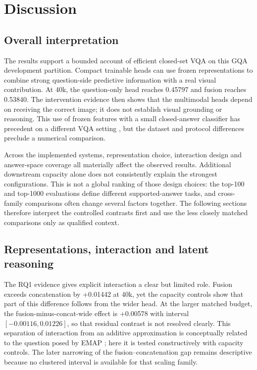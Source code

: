 \chapter{Discussion}

\section{Overall interpretation}
\label{sec:ch8-overall}

The results support a bounded account of efficient closed-set VQA on this GQA
development partition. Compact trainable heads can use frozen representations
to combine strong question-side predictive information with a real visual
contribution. At 40k, the question-only head reaches 0.45797 and fusion reaches
0.53840. The intervention evidence then shows that the multimodal heads depend
on receiving the correct image; it does not establish visual grounding or
reasoning. This use of frozen features with a small closed-answer classifier
has precedent on a different VQA setting \citep{deuser2022less}, but the
dataset and protocol differences preclude a numerical comparison.

Across the implemented systems, representation choice, interaction design and
answer-space coverage all materially affect the observed results. Additional
downstream capacity alone does not consistently explain the strongest
configurations. This is not a global ranking of those design choices: the
top-100 and top-1000 evaluations define different supported-answer tasks, and
cross-family comparisons often change several factors together. The following
sections therefore interpret the controlled contrasts first and use the less
closely matched comparisons only as qualified context.

\section{Representations, interaction and latent reasoning}
\label{sec:ch8-representation}

The RQ1 evidence gives explicit interaction a clear but limited role. Fusion
exceeds concatenation by +0.01442 at 40k, yet the capacity controls show that
part of this difference follows from the wider head. At the larger matched
budget, the fusion-minus-concat-wide effect is +0.00578 with interval
$[-0.00116,0.01226]$, so that residual contrast is not resolved clearly.
This separation of interaction from an additive approximation is conceptually
related to the question posed by EMAP \citep{hessel2020emap}; here it is tested
constructively with capacity controls. The later narrowing of the
fusion--concatenation gap remains descriptive because no clustered interval is
available for that scaling family.

